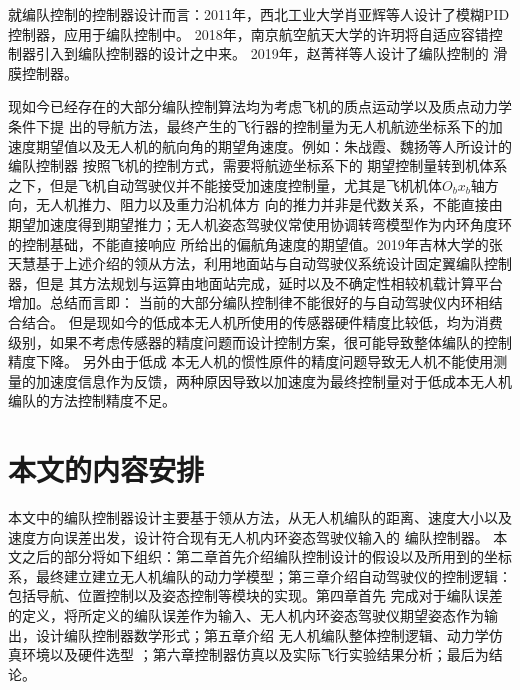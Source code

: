 就编队控制的控制器设计而言：2011年，西北工业大学肖亚辉等人设计了模糊PID控制器，应用于编队控制中。\cite{XiaoYaHui2011}
2018年，南京航空航天大学的许玥将自适应容错控制器引入到编队控制器的设计之中来。\cite{XuYue} 2019年，赵菁祥等人设计了编队控制的
滑膜控制器。

现如今已经存在的大部分编队控制算法均为考虑飞机的质点运动学以及质点动力学条件下提
出的导航方法，最终产生的飞行器的控制量为无人机航迹坐标系下的加速度期望值以及无人机的航向角的期望角速度。例如：朱战霞、魏扬等人所设计的编队控制器
按照飞机的控制方式，需要将航迹坐标系下的
期望控制量转到机体系之下，但是飞机自动驾驶仪并不能接受加速度控制量，尤其是飞机机体$O_bx_b$轴方向，无人机推力、阻力以及重力沿机体方
向的推力并非是代数关系，不能直接由期望加速度得到期望推力；无人机姿态驾驶仪常使用协调转弯模型作为内环角度环的控制基础，不能直接响应
所给出的偏航角速度的期望值。2019年吉林大学的张天慧基于上述介绍的领从方法，利用地面站与自动驾驶仪系统设计固定翼编队控制器，\cite{Zhangtianhui2019}但是
其方法规划与运算由地面站完成，延时以及不确定性相较机载计算平台增加。总结而言即：
当前的大部分编队控制律不能很好的与自动驾驶仪内环相结合结合。
但是现如今的低成本无人机所使用的传感器硬件精度比较低，均为消费级别，如果不考虑传感器的精度问题而设计控制方案，很可能导致整体编队的控制精度下降。
另外由于低成
本无人机的惯性原件的精度问题导致无人机不能使用测量的加速度信息作为反馈，两种原因导致以加速度为最终控制量对于低成本无人机编队的方法控制精度不足。
\section{本文的内容安排}
本文中的编队控制器设计主要基于领从方法，从无人机编队的距离、速度大小以及速度方向误差出发，设计符合现有无人机内环姿态驾驶仪输入的
编队控制器。
本文之后的部分将如下组织：第二章首先介绍编队控制设计的假设以及所用到的坐标系，最终建立建立无人机编队的动力学模型；第三章介绍自动驾驶仪的控制逻辑：包括导航、位置控制以及姿态控制等模块的实现。第四章首先
完成对于编队误差的定义，将所定义的编队误差作为输入、无人机内环姿态驾驶仪期望姿态作为输出，设计编队控制器数学形式；第五章介绍
无人机编队整体控制逻辑、动力学仿真环境以及硬件选型 ；第六章控制器仿真以及实际飞行实验结果分析；最后为结论。
